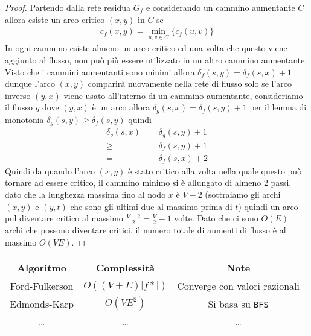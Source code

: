         \begin{proof}
            Partendo dalla rete residua $G_f$ e considerando un cammino aumentante $C$ allora esiste un arco critico $(x,y)$ in $C$ se \begin{align*}
                c_f(x,y) = \min_{u,v\in C}\{c_f(u,v)\}
            \end{align*}
            In ogni cammino esiste almeno un arco critico ed una volta che questo viene aggiunto al flusso, non può più essere utilizzato in un altro cammino aumentante.\newline
            Visto che i cammini aumentanti sono minimi allora $\delta_f(s,y) = \delta_{f}(s,x)+1$ dunque l'arco $(x,y)$ comparirà nuovamente nella rete di flusso solo se l'arco inverso $(y,x)$ viene usato all'interno di un cammino aumentante, consideriamo il flusso $g$ dove $(y,x)$ è un arco allora $\delta_{g}(s,x) = \delta_{f}(s,y)+1$ per il lemma di monotonia $\delta_{g}(s,y)\geq \delta_{f}(s,y)$ quindi \begin{align*}
                \delta_{g}(s,x) =& \delta_{g}(s,y)+1\\
                \geq & \delta_{f}(s,y)+1\\
                =& \delta_{f}(s,x)+2
            \end{align*}
            Quindi da quando l'arco $(x,y)$ è stato critico alla volta nella quale questo può tornare ad essere critico, il cammino minimo si è allungato di almeno $2$ passi, dato che la lunghezza massima fino al nodo $x$ è $V-2$ (sottraiamo gli archi $(x,y)$ e $(y,t)$ che sono gli ultimi due al massimo prima di $t$) quindi un arco pul diventare critico al massimo $\frac{V-2}2 = \frac{V}{2}-1$ volte.\newline
            Dato che ci sono $O(E)$ archi che possono diventare critici, il numero totale di aumenti di flusso è al massimo $O(VE)$.
        \end{proof}
        \begin{table}
            \centering
            \begin{tabular}{|c|c|c|}
                \hline
                \textbf{Algoritmo} & \textbf{Complessità} & \textbf{Note} \\
                \hline
                Ford-Fulkerson & $O((V+E)|f*|)$ & Converge con valori razionali \\
                \hline
                Edmonds-Karp & $O(VE^2)$ & Si basa su \texttt{BFS} \\
                \hline
                \dots & \dots & \dots \\
                \hline
            \end{tabular}
        \end{table}

